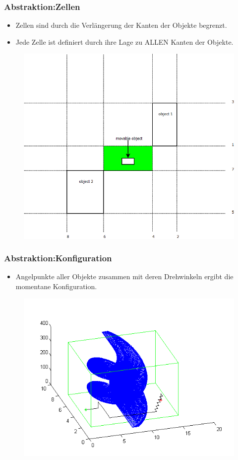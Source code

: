 \documentclass[final]{beamer}
\begin{document}
\begin{frame}
\frametitle{Abstraktion:Zellen}
\begin{itemize}
\item Zellen sind durch die Verlängerung der Kanten der Objekte begrenzt.
\item Jede Zelle ist definiert durch ihre Lage zu ALLEN Kanten der Objekte.
\end{itemize}
\begin{figure}
\centering
\includegraphics[scale=0.2]{../thesis/cellDivision}
\end{figure}
\end{frame}


\begin{frame}
\frametitle{Abstraktion:Konfiguration}
\begin{itemize}
\item Angelpunkte aller Objekte zusammen mit deren Drehwinkeln ergibt die momentane Konfiguration.
\end{itemize}
\begin{figure}
\centering
\includegraphics[scale=0.4]{../thesis/pathConfig}
\end{figure}
\end{frame}
\end{document}
